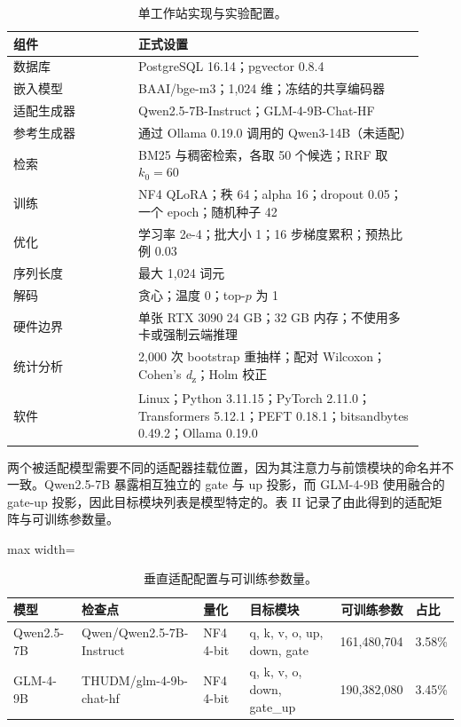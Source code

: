 \documentclass{article}
\begin{document}
\begin{table}[ht]
\centering
\caption{单工作站实现与实验配置。}

\begin{tabular}{p{0.28\linewidth}p{0.64\linewidth}}
\toprule
组件 & 正式设置 \\
\midrule
数据库 & PostgreSQL 16.14；pgvector 0.8.4 \\
嵌入模型 & BAAI/bge-m3；1{,}024 维；冻结的共享编码器 \\
适配生成器 & Qwen2.5-7B-Instruct；GLM-4-9B-Chat-HF \\
参考生成器 & 通过 Ollama 0.19.0 调用的 Qwen3-14B（未适配） \\
检索 & BM25 与稠密检索，各取 50 个候选；RRF 取 $k_0=60$ \\
训练 & NF4 QLoRA；秩 64；alpha 16；dropout 0.05；一个 epoch；随机种子 42 \\
优化 & 学习率 2e-4；批大小 1；16 步梯度累积；预热比例 0.03 \\
序列长度 & 最大 1{,}024 词元 \\
解码 & 贪心；温度 0；top-$p$ 为 1 \\
硬件边界 & 单张 RTX 3090 24 GB；32 GB 内存；不使用多卡或强制云端推理 \\
统计分析 & 2{,}000 次 bootstrap 重抽样；配对 Wilcoxon；Cohen's \emph{d}\textsubscript{z}；Holm 校正 \\
软件 & Linux；Python 3.11.15；PyTorch 2.11.0；Transformers 5.12.1；PEFT 0.18.1；bitsandbytes 0.49.2；Ollama 0.19.0 \\
\bottomrule
\end{tabular}
\end{table}

两个被适配模型需要不同的适配器挂载位置，因为其注意力与前馈模块的命名并不一致。Qwen2.5-7B 暴露相互独立的 gate 与 up 投影，而 GLM-4-9B 使用融合的 gate-up 投影，因此目标模块列表是模型特定的。表 II 记录了由此得到的适配矩阵与可训练参数量。

\begin{table}[ht]
\centering
\caption{垂直适配配置与可训练参数量。}

\small
\begin{adjustbox}{max width=\linewidth}
\begin{tabular}{llllrl}
\toprule
模型 & 检查点 & 量化 & 目标模块 & 可训练参数 & 占比 \\
\midrule
Qwen2.5-7B & Qwen/Qwen2.5-7B-Instruct & NF4 4-bit & q, k, v, o, up, down, gate & 161{,}480{,}704 & 3.58\% \\
GLM-4-9B & THUDM/glm-4-9b-chat-hf & NF4 4-bit & q, k, v, o, down, gate\_up & 190{,}382{,}080 & 3.45\% \\
\bottomrule
\end{tabular}
\end{adjustbox}
\end{table}
\end{document}
